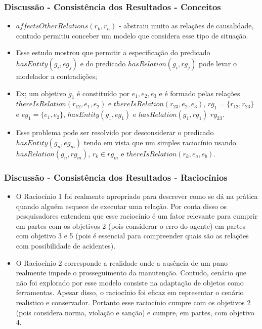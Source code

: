 \documentclass{beamer}
\begin{document}
\begin{frame}
	\frametitle{Discussão - Consistência dos Resultados - Conceitos}
	\begin{itemize}
		\item $affectsOtherRelations(r_k,r_n)$ - abstraiu muito as relações de causalidade, contudo permitiu conceber um modelo que considera esse tipo de situação.
		\item Esse estudo mostrou que permitir a especificação do predicado $hasEntity(g_i,eg_j)$ e do predicado $hasRelation(g_i,rg_j)$ pode levar o modelador a contradições;
		\item Ex; um objetivo $g_1$ é constituído por $e_1,e_2,e_3$ e é formado pelas relações $thereIsRelation(r_{12},e_1,e_2)$ e $thereIsRelation(r_{23},e_2,e_3)$, $rg_1 = \{ r_{12},r_{23} \}$ e $ eg_1 = \{ e_1, e_2 \} $, $ hasEntity(g_1,eg_1) $ e $ hasRelation(g_1, rg_1) $ $rg_{23}$. 
		\item Esse problema pode ser resolvido por desconsiderar o predicado $hasEntity(g_n,eg_m)$ tendo em vista que um simples raciocínio usando $hasRelation(g_n,rg_m)$, $r_k \in rg_m$ e $thereIsRelation(r_k, e_a,e_b)$.
	\end{itemize}
\end{frame}

\begin{frame}
	\frametitle{Discussão - Consistência dos Resultados - Raciocínios}
	\begin{itemize}
		\item O Raciocínio 1 foi realmente apropriado para descrever como se dá na prática quando alguém esquece de executar uma relação. Por conta disso os pesquisadores entendem que esse raciocínio é um fator relevante para cumprir em partes com os objetivos 2 (pois considerar o erro do agente) em partes com objetivo  3 e 5 (pois é essencial para compreender quais são as relações com possibilidade de acidentes). 
		\item O Raciocínio 2 corresponde a realidade onde a ausência de um pano realmente impede o prosseguimento da manutenção. Contudo, cenário que não foi explorado por esse modelo consiste na adaptação de objetos como ferramentas. Apesar disso, o raciocínio foi eficaz em representar o cenário realistico e conservador. Portanto esse raciocínio cumpre com os objetivos 2 (pois considera norma, violação e sanção) e cumpre, em partes, com objetivo 4.
	\end{itemize}
\end{frame}
\end{document}
